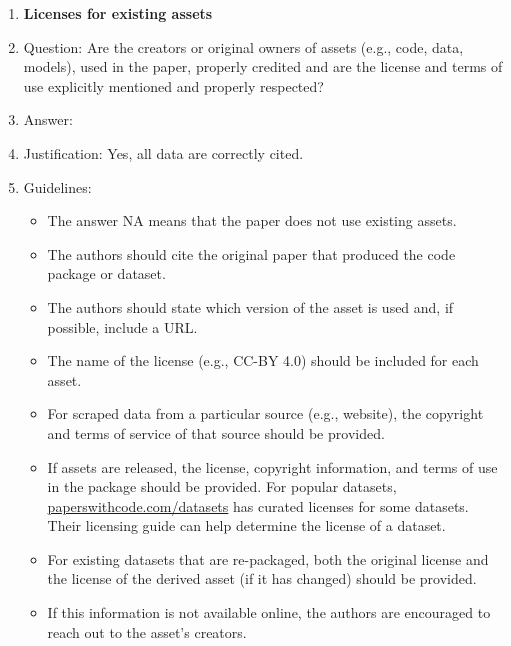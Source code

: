 \documentclass{article}
\theoremstyle{plain}
\theoremstyle{definition}
\theoremstyle{remark}
\begin{document}
\begin{enumerate}
\item {\bf Licenses for existing assets}
    \item[] Question: Are the creators or original owners of assets (e.g., code, data, models), used in the paper, properly credited and are the license and terms of use explicitly mentioned and properly respected?
    \item[] Answer: \answerYes{} %
    \item[] Justification: Yes, all data are correctly cited. 
    \item[] Guidelines:
    \begin{itemize}
        \item The answer NA means that the paper does not use existing assets.
        \item The authors should cite the original paper that produced the code package or dataset.
        \item The authors should state which version of the asset is used and, if possible, include a URL.
        \item The name of the license (e.g., CC-BY 4.0) should be included for each asset.
        \item For scraped data from a particular source (e.g., website), the copyright and terms of service of that source should be provided.
        \item If assets are released, the license, copyright information, and terms of use in the package should be provided. For popular datasets, \url{paperswithcode.com/datasets} has curated licenses for some datasets. Their licensing guide can help determine the license of a dataset.
        \item For existing datasets that are re-packaged, both the original license and the license of the derived asset (if it has changed) should be provided.
        \item If this information is not available online, the authors are encouraged to reach out to the asset's creators.
    \end{itemize}


\end{enumerate}
\end{document}

